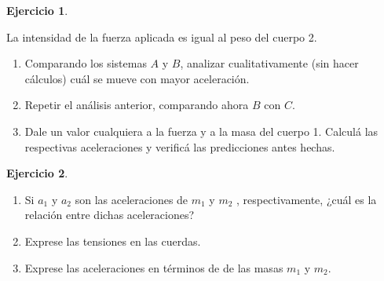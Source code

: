 \documentclass[a4paper,12pt,twoside]{book}
\newtheorem{ejercicio}{{Ejercicio}}[chapter]
\begin{document}
\begin{mdframed}[style=ejercicio-intermedio]
    \begin{ejercicio}
    \end{ejercicio}
   La intensidad de la fuerza aplicada es igual al peso del cuerpo 2.
   \begin{center}
        \def\svgwidth{\linewidth}
        
    \end{center}
    \begin{enumerate}
        \item Comparando los sistemas $A$ y $B$, analizar cualitativamente (sin hacer cálculos) cuál se mueve con mayor aceleración.
        \item Repetir el análisis anterior, comparando ahora $B$ con $C$.
        \item Dale un valor cualquiera a la fuerza y a la masa del cuerpo 1. Calculá las respectivas aceleraciones y verificá las predicciones antes hechas.
    \end{enumerate}
\end{mdframed}

\begin{mdframed}[style=ejercicio-dificil]
    \begin{ejercicio}
    \end{ejercicio}
    \begin{center}
        \def\svgwidth{0.5\linewidth}
        
    \end{center}
    \begin{enumerate}
        \item Si $a_1$ y $a_2$ son las aceleraciones de $m_1$ y $m_2$ , respectivamente, ¿cuál es la relación entre dichas aceleraciones?
        \item Exprese las tensiones en las cuerdas.
        \item Exprese las aceleraciones en términos de de las masas $m_1$ y $m_2$.
    \end{enumerate}
\end{mdframed}
\end{document}
